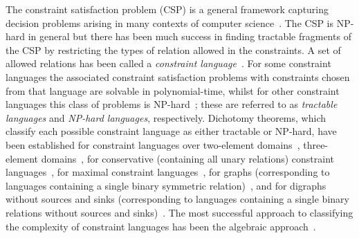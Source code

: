 \documentclass[11pt, reqno]{article}
\theoremstyle{remark}
\begin{document}
The constraint satisfaction problem (CSP) is a general framework capturing
decision problems arising in many contexts of computer
science~\cite{Dechter03:processing,Apt03:principles,Hell08:survey}. The CSP is NP-hard in general but there has been
much success in finding tractable fragments of the CSP by restricting the types
of relation allowed in the constraints.  A set of allowed relations has been
called a \emph{constraint language}~\cite{Feder98:monotone,Jeavons98:algebraic}.
For some constraint languages the associated constraint satisfaction problems
with constraints chosen from that language are solvable in polynomial-time,
whilst for other constraint languages this class of problems is
NP-hard~\cite{Jeavons97:closure,Feder98:monotone}; these are referred to as
\emph{tractable languages} and \emph{NP-hard languages}, respectively. Dichotomy
theorems, which classify each possible constraint language as either tractable
or NP-hard, have been established for constraint languages over two-element
domains~\cite{Schaefer78:complexity}, three-element
domains~\cite{Bulatov06:3-elementJACM}, for conservative (containing all unary
relations) constraint
languages~\cite{Bulatov11:conservative}, for maximal constraint
languages~\cite{Bulatov01:complexity,Bulatov04:graph}, for graphs (corresponding
to languages containing a single binary symmetric relation)~\cite{Hell90:h-coloring}, and for
digraphs without sources and sinks (corresponding to languages containing a
single binary relations without sources and sinks)~\cite{Barto09:siam}. The most successful
approach to classifying the complexity of constraint languages has been the
algebraic approach~\cite{Jeavons97:closure,Bulatov05:classifying,Barto14:jacm}.
\end{document}
